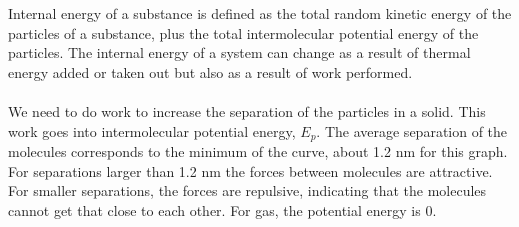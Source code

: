 \\\\
Internal energy of a substance is defined as the total random kinetic energy of the particles of a substance, plus the total intermolecular potential energy of the particles. The internal energy of a system can change as a result of thermal energy added or taken out but also as a result of work performed. 
\\\\
We need to do work to increase the separation of the particles in a solid. This work goes into intermolecular potential energy, $E_p$. The average separation of the molecules corresponds to the minimum of the curve, about 1.2 nm for this graph. For separations larger than 1.2 nm the forces between molecules are attractive. For smaller separations, the forces are repulsive, indicating that the molecules cannot get that close to each other. For gas, the potential energy is 0.
\begin{center}
\end{center}
